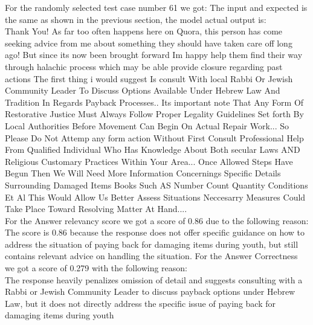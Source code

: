 \documentclass[11pt]{article}
\begin{document}
For the randomly selected test case number 61 we got:   
The input and expected is the same as shown in the previous section, the model actual output is:\\
Thank You! As far too often happens here on Quora, this person has come seeking advice from me about something they should have taken care off long ago! But since its now been brought forward Im happy help them find their way through halachic process which may be able provide closure regarding past actions   The first thing i would suggest Is consult With local Rabbi Or Jewish Community Leader To Discuss Options Available Under Hebrew Law And Tradition In Regards Payback Processes.. Its important note That Any Form Of Restorative Justice Must Always Follow Proper Legality Guidelines Set forth By Local Authorities Before Movement Can Begin On Actual Repair Work... So Please Do Not Attemp any form action Without First Consult Professional Help From Qualified Individual Who Has Knowledge About Both secular Laws AND Religious Customary Practices Within Your Area... Once Allowed Steps Have Begun Then We Will Need More Information Concernings Specific Details Surrounding Damaged Items Books Such AS Number Count Quantity Conditions Et Al This Would Allow Us Better Assess Situations Neccesarry Measures Could Take Place Toward Resolving Matter At Hand....\\

For the Answer relevancy score we got a score of 0.86 due to the following reason:\\
The score is 0.86 because the response does not offer specific guidance on how to address the situation of paying back for damaging items during youth, but still contains relevant advice on handling the situation.
For the Answer Correctness  we got a score of 0.279 with the following reason:\\
The response heavily penalizes omission of detail and suggests consulting with a Rabbi or Jewish Community Leader to discuss payback options under Hebrew Law, but it does not directly address the specific issue of paying back for damaging items during youth
\end{document}
